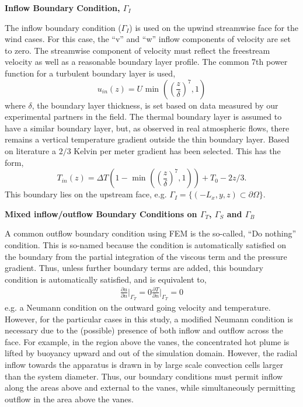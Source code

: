 \textbf{Inflow Boundary Condition, $\Gamma_I$} 

The inflow boundary condition ($\Gamma_I$) 
is used on the upwind streamwise face for the wind cases. For this case, 
the ``v'' and ``w'' inflow components of velocity are set to zero. 
The streamwise component of velocity must reflect the freestream velocity as 
well as a reasonable boundary layer profile. 
The common 7th power function for a turbulent boundary layer is used,   
\begin{equation*}
  u_{in}(z) = U \text{ min }\left(\left(\frac{z}{\delta}\right)^7,1\right)
  \label{eq:bl_u}
\end{equation*}
where $\delta$, the boundary layer thickness, is set based on data
measured by our experimental partners in the field. 
The thermal boundary layer is assumed to have a similar boundary layer,
but, as observed in real atmospheric flows, there remains a vertical
temperature gradient outside the thin boundary layer. Based on
literature a $2/3$ Kelvin per meter gradient has been
selected\cite{Blocken2007238}. This has the form, 
\begin{equation*}
  T_{in}(z) = \Delta T \left(1- \text{ min }\left(\left(\frac{z}{\delta}\right)^7,1\right)\right) + T_0 - 2z/3. 
  \label{eq:bl_t}
\end{equation*}
This boundary lies on the upstream face, e.g. $\Gamma_I = \{(-L_x,y,z) \subset \partial \Omega \} $. 

\textbf{Mixed inflow/outflow Boundary Conditions on $\Gamma_T$, $\Gamma_S$ and $\Gamma_B$} 

A common outflow boundary condition using FEM is the so-called, ``Do nothing'' condition. 
This is so-named because the condition is automatically satisfied on the boundary 
from the partial integration of the viscous term and the pressure gradient. Thus, unless
further boundary terms are added, this boundary condition is automatically satisfied, 
and is equivalent to,
\begin{align}
  \frac{\partial u}{\partial n}\bigg|_{\Gamma_T} = 0
  \frac{\partial T}{\partial n}\bigg|_{\Gamma_T} = 0
\end{align}
e.g. a Neumann condition on the outward going velocity and temperature. 
However, for the particular cases in this study, 
a modified Neumann condition is necessary due to the (possible) presence of
both inflow and outflow across the face. 
For example, in the region above the vanes, the concentrated hot plume is
lifted by buoyancy upward and out of the simulation domain. However, the
radial inflow towards the apparatus is drawn in by large scale
convection cells larger than the system diameter. Thus, our boundary
conditions must permit inflow along the areas above and external to the
vanes, while simultaneously permitting outflow in the area above the vanes. 


